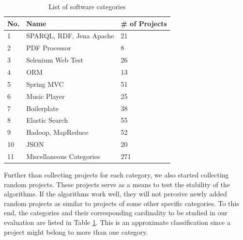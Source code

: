 
\begin{table}[h!]
	\centering
	\begin{tabular}{|p{0.80cm}|p{6.00cm}|p{2.80cm}|}  \hline
		{\bf No.} & {\bf Name} & {\bf \# of Projects} \\  \hline
		1 & SPARQL, RDF, Jena Apache & 21 \\  \hline
		2 & PDF Processor & 8  \\  \hline
		3 & Selenium Web Test & 26  \\  \hline
		4 & ORM & 13  \\  \hline
		5 & Spring MVC & 51  \\  \hline
		6 & Music Player & 25  \\  \hline
		7 & Boilerplate & 38  \\  \hline
		8 & Elastic Search & 55  \\  \hline
		9 & Hadoop, MapReduce & 52  \\  \hline
		10 & JSON & 20  \\  \hline
		11 & Miscellaneous Categories & 271  \\  \hline
	\end{tabular}
	\caption[List of software categories]{List of software categories}
	\label{tab:Categories}
\end{table}


Further than collecting projects for each category, we also started collecting random projects. These projects serve as a means to test the stability of the algorithms. If the algorithms work well, they will not perceive newly added random projects as similar to projects of some other specific categories. To this end, the categories and their corresponding cardinality to be studied in our evaluation are listed in Table \ref{tab:Categories}. This is an approximate classification since a project might belong to more than one category.

